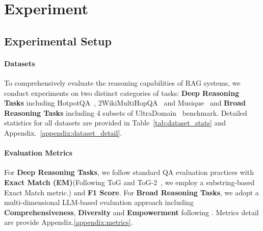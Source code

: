 \section{Experiment}

\subsection{Experimental Setup}

\paragraph{Datasets}
To comprehensively evaluate the reasoning capabilities of RAG systems, we conduct experiments on two distinct categories of tasks: \textbf{Deep Reasoning Tasks} including HotpotQA~\citep{yang2018hotpotqa}, 2WikiMultiHopQA~\citep{2wiki} and Musique~\citep{musique} and \textbf{Broad Reasoning Tasks} including 4 subsets of UltraDomain~\citep{qian2025memorag} benchmark. 
Detailed statistics for all datasets are provided in Table~\ref{tab:dataset_stats} and Appendix.~\ref{appendix:dataset_detail}.



\paragraph{Evaluation Metrics}
For \textbf{Deep Reasoning Tasks}, we follow standard QA evaluation practices with \textbf{Exact Match (EM)}(Following ToG and ToG-2~\citep{sun2023tog,ma2024tog2}, we employ a substring-based Exact Match metric.) and \textbf{F1 Score}. For \textbf{Broad Reasoning Tasks}, we adopt a multi-dimensional LLM-based evaluation approach including \textbf{Comprehensiveness}, \textbf{Diversity} and \textbf{Empowerment} following \citep{guo2024lightrag}. Metrics detail are provide Appendix.\ref{appendix:metrics}.

